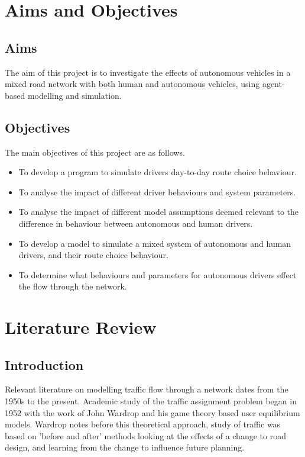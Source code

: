\documentclass[12pt, a4paper, onecolumn]{article}
\begin{document}
\pagebreak 

\section{Aims and Objectives}
\subsection{Aims}
The aim of this project is to investigate the effects of autonomous vehicles in a mixed road network with both human and autonomous vehicles, using agent-based modelling and simulation.

\subsection{Objectives}
The main objectives of this project are as follows.
\begin{itemize}
\item{To develop a program to simulate drivers day-to-day route choice behaviour.}
\item{To analyse the impact of different driver behaviours and system parameters.}
\item{To analyse the impact of different model assumptions deemed relevant to the difference in behaviour between autonomous and human drivers.}
\item{To develop a model to simulate a mixed system of autonomous and human drivers, and their route choice behaviour.}
\item{To determine what behaviours and parameters for autonomous drivers effect the flow through the network.}
 \end{itemize}

\pagebreak

\section{Literature Review}

\subsection{Introduction}
Relevant literature on modelling traffic flow through a network dates from the 1950s to the present. Academic study of the traffic assignment problem began in 1952 with the work of John Wardrop and his game theory based user equilibrium models. Wardrop notes before this theoretical approach, study of traffic was based on 'before and after' methods looking at the effects of a change to road design, and learning from the change to influence future planning. 
\end{document}
